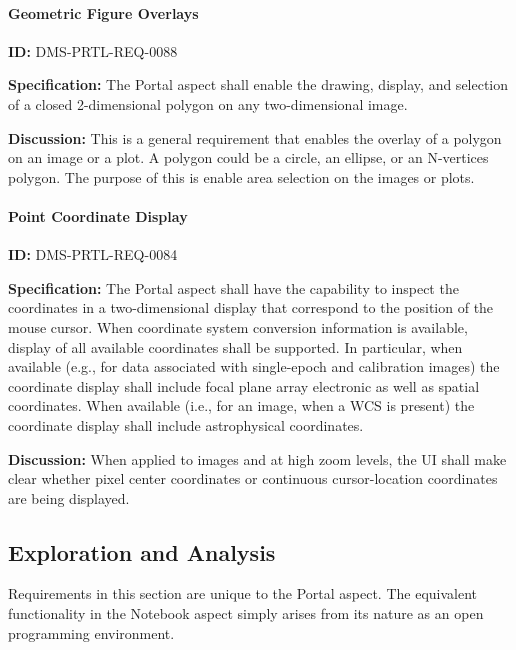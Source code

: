 \documentclass[SE,toc,lsstdraft]{lsstdoc}
\begin{document}
\paragraph{Geometric Figure Overlays}\hfill  %

\label{DMS-PRTL-REQ-0088}
\textbf{ID:} DMS-PRTL-REQ-0088

\textbf{Specification:}
The Portal aspect shall enable the drawing, display, and selection of a closed 2-dimensional polygon on any two-dimensional image.

\textbf{Discussion:}
This is a general requirement that enables the overlay of a polygon on an image or a plot.  A polygon could be a circle, an ellipse, or an N-vertices polygon.  The purpose of this is enable area selection on the images or plots.

\paragraph{Point Coordinate Display}\hfill  %

\label{DMS-PRTL-REQ-0084}
\textbf{ID:} DMS-PRTL-REQ-0084

\textbf{Specification:}
The Portal aspect shall have the capability to inspect the coordinates in a two-dimensional display that correspond to the position of the mouse cursor.  When coordinate system conversion information is available, display of all available coordinates shall be supported.  In particular, when available (e.g., for data associated with single-epoch and calibration images) the coordinate display shall include focal plane array electronic as well as  spatial coordinates.  When available (i.e., for an image, when a WCS is present) the coordinate display shall include astrophysical coordinates.

\textbf{Discussion:}
When applied to images and at high zoom levels, the UI shall make clear whether pixel center coordinates or continuous cursor-location coordinates are being displayed.

\subsection{Exploration and Analysis}

Requirements in this section are unique to the Portal aspect.  The equivalent functionality in the Notebook aspect simply arises from its nature as an open programming environment.
\end{document}
